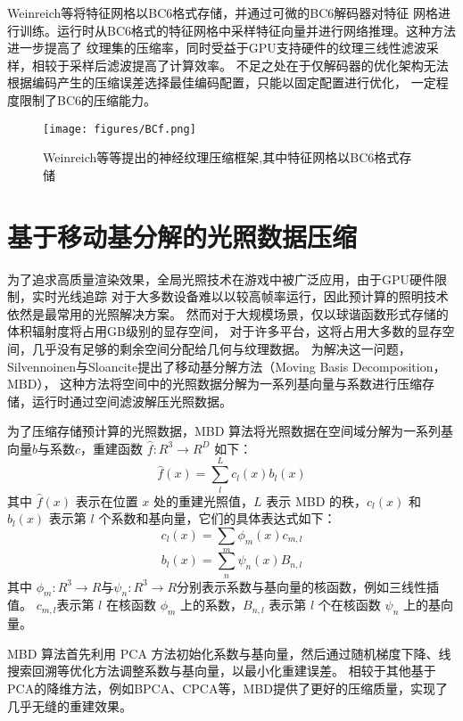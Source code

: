 Weinreich等\cite{weinreich2024real}将特征网格以BC6格式存储，并通过可微的BC6解码器对特征
网格进行训练。运行时从BC6格式的特征网格中采样特征向量并进行网络推理。这种方法进一步提高了
纹理集的压缩率，同时受益于GPU支持硬件的纹理三线性滤波采样，相较于采样后滤波提高了计算效率。
不足之处在于仅解码器的优化架构无法根据编码产生的压缩误差选择最佳编码配置，只能以固定配置进行优化，
一定程度限制了BC6的压缩能力。

\begin{figure}[htbp]
    \centering
    \texttt{[image: figures/BCf.png]}
    \caption{Weinreich等\cite{weinreich2024real}等提出的神经纹理压缩框架,其中特征网格以BC6格式存储}
    \label{fig:BCf}
\end{figure}


\section{基于移动基分解的光照数据压缩}

为了追求高质量渲染效果，全局光照技术在游戏中被广泛应用，由于GPU硬件限制，实时光线追踪
对于大多数设备难以以较高帧率运行，因此预计算的照明技术依然是最常用的光照解决方案。
然而对于大规模场景，仅以球谐函数形式存储的体积辐射度将占用GB级别的显存空间\cite{silvennoinen2021moving}，
对于许多平台，这将占用大多数的显存空间，几乎没有足够的剩余空间分配给几何与纹理数据。
为解决这一问题，Silvennoinen与Sloancite\cite{silvennoinen2021moving}提出了移动基分解方法（Moving Basis Decomposition，MBD），
这种方法将空间中的光照数据分解为一系列基向量与系数进行压缩存储，运行时通过空间滤波解压光照数据。

为了压缩存储预计算的光照数据，MBD 算法将光照数据在空间域分解为一系列基向量$b$与系数$c$，重建函数 $\hat{f}:R^3\to R^D$ 如下：
$$
\hat f(x)=\sum_{l}^L c_{l} (x)b_{l}(x)
$$
其中 $\hat{f}(x)$ 表示在位置 $x$ 处的重建光照值，$L$ 表示 MBD 的秩，$c_l(x)$ 和 $b_l(x)$ 表示第 $l$ 个系数和基向量，它们的具体表达式如下：
$$
c_{l}(x)=\sum_{m}\phi_{m} (x)c_{m,l}
$$
$$
b_{l}(x)=\sum_{n}\psi_{n} (x)B_{n,l}
$$
其中 $\phi_{m}: R^{3} \rightarrow R$与$\psi_{n}: R^{3} \rightarrow R$分别表示系数与基向量的核函数，例如三线性插值。 $c_{m,l}$表示第 $l$ 在核函数 $\phi_m$ 上的系数，$B_{n,l}$ 表示第 $l$ 个在核函数 $\psi_n$ 上的基向量。

MBD 算法首先利用 PCA 方法初始化系数与基向量，然后通过随机梯度下降、线搜索回溯等优化方法调整系数与基向量，以最小化重建误差。
相较于其他基于PCA的降维方法，例如BPCA\cite{nishino2005clustered}、CPCA\cite{sloan2003clustered}等，MBD提供了更好的压缩质量，实现了几乎无缝的重建效果。

